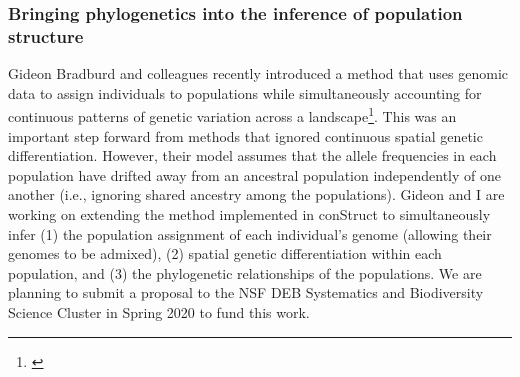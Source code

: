 \subsubsection*{Bringing phylogenetics into the inference of population structure}
Gideon Bradburd and colleagues recently introduced a method that uses genomic
data to assign individuals to populations while simultaneously accounting for
continuous patterns of genetic variation across a
landscape\footnote{\label{Bradburd18}}.
This was an important step forward from methods that ignored continuous spatial
genetic differentiation.
However, their model assumes that the allele frequencies in each population
have drifted away from an ancestral population independently of one another
(i.e., ignoring shared ancestry among the populations).
Gideon and I are working on extending the method implemented in conStruct
to simultaneously infer
(1) the population assignment of each individual's genome (allowing their
genomes to be admixed),
(2) spatial genetic differentiation within each population, and
(3) the phylogenetic relationships of the populations.
We are planning to submit a proposal to the NSF DEB Systematics and
Biodiversity Science Cluster in Spring 2020 to fund this work.



